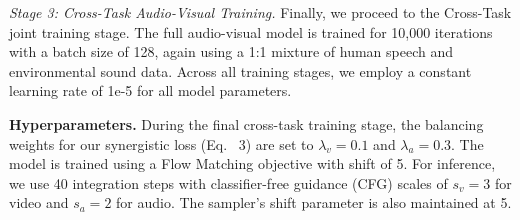\textit{Stage 3: Cross-Task Audio-Visual Training.}
Finally, we proceed to the Cross-Task joint training stage. The full audio-visual model is trained for 10,000 iterations with a batch size of 128, again using a 1:1 mixture of human speech and environmental sound data. Across all training stages, we employ a constant learning rate of 1e-5 for all model parameters.

\noindent\textbf{Hyperparameters.}
During the final cross-task training stage, the balancing weights for our synergistic loss (Eq. ~3) are set to $\lambda_v=0.1$ and $\lambda_a=0.3$. The model is trained using a Flow Matching objective with shift of 5. For inference, we use 40 integration steps with classifier-free guidance (CFG) scales of $s_v=3$ for video and $s_a=2$ for audio. The sampler's shift parameter is also maintained at 5.



